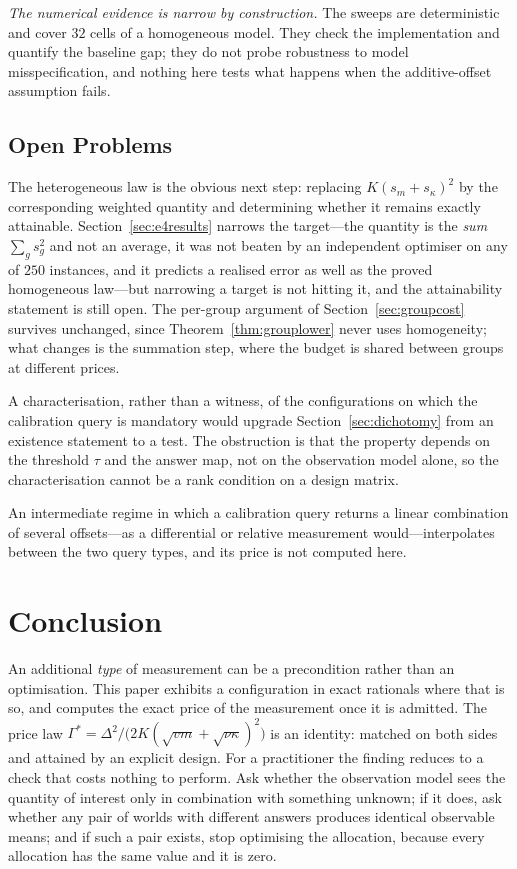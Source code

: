 \emph{The numerical evidence is narrow by construction.} The sweeps are deterministic and
cover $32$ cells of a homogeneous model. They check the implementation and quantify the
baseline gap; they do not probe robustness to model misspecification, and nothing here tests
what happens when the additive-offset assumption fails.

\subsection{Open Problems}
\label{sec:opens}

The heterogeneous law is the obvious next step: replacing
$K(s_{m}+s_{\kappa})^{2}$ by the corresponding weighted quantity and determining
whether it remains exactly attainable. Section~\ref{sec:e4results} narrows the target---the
quantity is the \emph{sum} $\sum_{g}s_{g}^{2}$ and not an average, it was not beaten by an
independent optimiser on any of $250$ instances, and it predicts a realised error as well as
the proved homogeneous law---but narrowing a target is not hitting it, and the attainability
statement is still open. The per-group argument of
Section~\ref{sec:groupcost} survives unchanged, since Theorem~\ref{thm:grouplower} never
uses homogeneity; what changes is the summation step, where the budget is shared between
groups at different prices.

A characterisation, rather than a witness, of the configurations on which the calibration
query is mandatory would upgrade Section~\ref{sec:dichotomy} from an existence statement to
a test. The obstruction is that the property depends on the threshold $\tau$ and the answer
map, not on the observation model alone, so the characterisation cannot be a rank condition
on a design matrix.

An intermediate regime in which a calibration query returns a linear combination of several
offsets---as a differential or relative measurement would---interpolates between the two
query types, and its price is not computed here.

\section{Conclusion}

An additional \emph{type} of measurement can be a precondition rather than an optimisation.
This paper exhibits a configuration in exact rationals where that is so, and computes the
exact price of the measurement once it is admitted. The price law
$\Gamma^{*}=\Delta^{2}/\bigl(2K(\sqrt{vm}+\sqrt{\nu\kappa})^{2}\bigr)$ is an identity: matched
on both sides and attained by an explicit design. For a practitioner the finding reduces to
a check that costs nothing to perform. Ask whether the observation model sees the quantity
of interest only in combination with something unknown; if it does, ask whether any pair of
worlds with different answers produces identical observable means; and if such a pair
exists, stop optimising the allocation, because every allocation has the same value and it
is zero.

